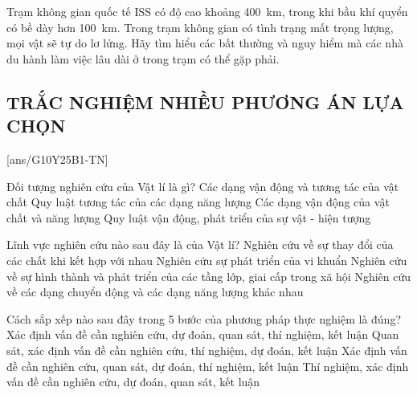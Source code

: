 \begin{vd}
	Trạm không gian quốc tế ISS có độ cao khoảng \SI{400}{km}, trong khi bầu khí quyển có bề dày hơn \SI{100}{km}. Trong trạm không gian có tình trạng mất trọng lượng, mọi vật sẽ tự do lơ lửng. Hãy tìm hiểu các bất thường và nguy hiểm mà các nhà du hành làm việc lâu dài ở trong trạm có thể gặp phải.
	
\end{vd}

\subsection{TRẮC NGHIỆM NHIỀU PHƯƠNG ÁN LỰA CHỌN}
\setcounter{ex}{0}
[ans/G10Y25B1-TN]
\begin{ex}
	Đối tượng nghiên cứu của Vật lí là gì?
	\choice
	{Các dạng vận động và tương tác của vật chất}
	{Quy luật tương tác của các dạng năng lượng}
	{\True Các dạng vận động của vật chất và năng lượng}
	{Quy luật vận động, phát triển của sự vật - hiện tượng}
	\loigiai{}
\end{ex}

\begin{ex}
	Lĩnh vực nghiên cứu nào sau đây là của Vật lí?
	\choice
	{Nghiên cứu về sự thay đổi của các chất khi kết hợp với nhau}
	{Nghiên cứu sự phát triển của vi khuẩn}
	{Nghiên cứu về sự hình thành và phát triển của các tầng lớp, giai cấp trong xã hội}
	{\True Nghiên cứu về các dạng chuyển động và các dạng năng lượng khác nhau}
	\loigiai{}
\end{ex}

\begin{ex}
	Cách sắp xếp nào sau đây trong 5 bước của phương pháp thực nghiệm là đúng?
	\choice
	{Xác định vấn đề cần nghiên cứu, dự đoán, quan sát, thí nghiệm, kết luận}
	{Quan sát, xác định vấn đề cần nghiên cứu, thí nghiệm, dự đoán, kết luận}
	{\True Xác định vấn đề cần nghiên cứu, quan sát, dự đoán, thí nghiệm, kết luận}
	{Thí nghiệm, xác định vấn đề cần nghiên cứu, dự đoán, quan sát, kết luận}
	\loigiai{}
\end{ex}

